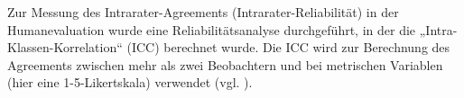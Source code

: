 Zur Messung des Intrarater-Agreements (Intrarater-Reliabilität) in der Humanevaluation wurde eine Reliabilitätsanalyse durchgeführt, in der die „Intra-Klas\-sen-Korrelation“ (ICC) berechnet wurde. Die ICC wird zur Berechnung des Agreements zwischen mehr als zwei Beobachtern und bei metrischen Variablen (hier eine 1-5-Likertskala) verwendet (vgl. \citealt{LandisKoch1977}).


\begin{table}





\end{table}
